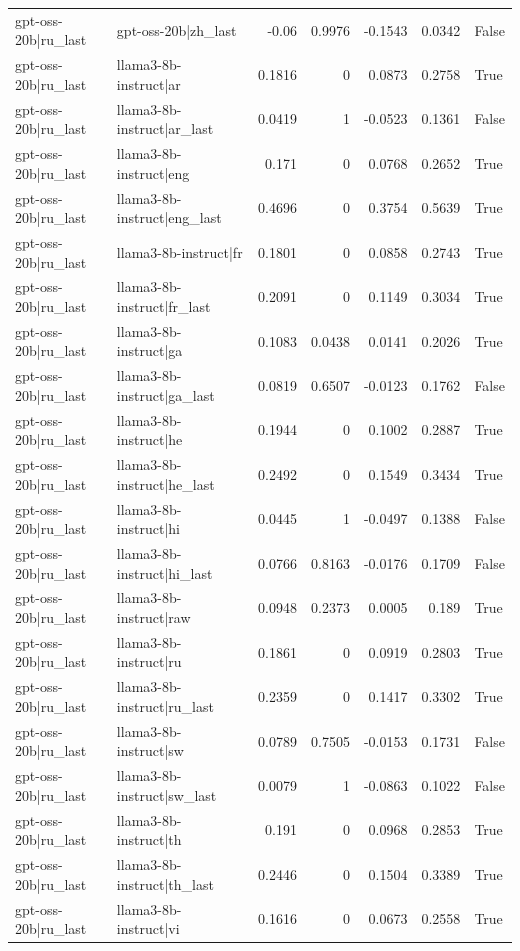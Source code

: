 \begin{table}
\begin{tabular}{l l r r r r l}
gpt-oss-20b|ru_last & gpt-oss-20b|zh_last & -0.06 & 0.9976 & -0.1543 & 0.0342 & False \\
gpt-oss-20b|ru_last & llama3-8b-instruct|ar & 0.1816 & 0 & 0.0873 & 0.2758 & True \\
gpt-oss-20b|ru_last & llama3-8b-instruct|ar_last & 0.0419 & 1 & -0.0523 & 0.1361 & False \\
gpt-oss-20b|ru_last & llama3-8b-instruct|eng & 0.171 & 0 & 0.0768 & 0.2652 & True \\
gpt-oss-20b|ru_last & llama3-8b-instruct|eng_last & 0.4696 & 0 & 0.3754 & 0.5639 & True \\
gpt-oss-20b|ru_last & llama3-8b-instruct|fr & 0.1801 & 0 & 0.0858 & 0.2743 & True \\
gpt-oss-20b|ru_last & llama3-8b-instruct|fr_last & 0.2091 & 0 & 0.1149 & 0.3034 & True \\
gpt-oss-20b|ru_last & llama3-8b-instruct|ga & 0.1083 & 0.0438 & 0.0141 & 0.2026 & True \\
gpt-oss-20b|ru_last & llama3-8b-instruct|ga_last & 0.0819 & 0.6507 & -0.0123 & 0.1762 & False \\
gpt-oss-20b|ru_last & llama3-8b-instruct|he & 0.1944 & 0 & 0.1002 & 0.2887 & True \\
gpt-oss-20b|ru_last & llama3-8b-instruct|he_last & 0.2492 & 0 & 0.1549 & 0.3434 & True \\
gpt-oss-20b|ru_last & llama3-8b-instruct|hi & 0.0445 & 1 & -0.0497 & 0.1388 & False \\
gpt-oss-20b|ru_last & llama3-8b-instruct|hi_last & 0.0766 & 0.8163 & -0.0176 & 0.1709 & False \\
gpt-oss-20b|ru_last & llama3-8b-instruct|raw & 0.0948 & 0.2373 & 0.0005 & 0.189 & True \\
gpt-oss-20b|ru_last & llama3-8b-instruct|ru & 0.1861 & 0 & 0.0919 & 0.2803 & True \\
gpt-oss-20b|ru_last & llama3-8b-instruct|ru_last & 0.2359 & 0 & 0.1417 & 0.3302 & True \\
gpt-oss-20b|ru_last & llama3-8b-instruct|sw & 0.0789 & 0.7505 & -0.0153 & 0.1731 & False \\
gpt-oss-20b|ru_last & llama3-8b-instruct|sw_last & 0.0079 & 1 & -0.0863 & 0.1022 & False \\
gpt-oss-20b|ru_last & llama3-8b-instruct|th & 0.191 & 0 & 0.0968 & 0.2853 & True \\
gpt-oss-20b|ru_last & llama3-8b-instruct|th_last & 0.2446 & 0 & 0.1504 & 0.3389 & True \\
gpt-oss-20b|ru_last & llama3-8b-instruct|vi & 0.1616 & 0 & 0.0673 & 0.2558 & True \\

\end{tabular}
\end{table}
